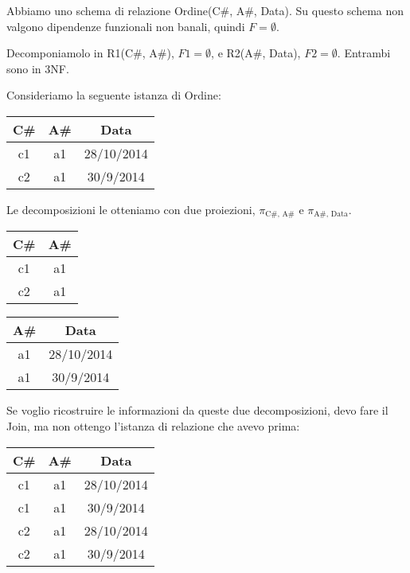 Abbiamo uno schema di relazione Ordine(C\#, A\#, Data). Su questo schema non valgono dipendenze funzionali non banali, quindi $F = \emptyset$.

Decomponiamolo in R1(C\#, A\#), $F1 = \emptyset$, e R2(A\#, Data), $F2 = \emptyset$. Entrambi sono in 3NF.

Consideriamo la seguente istanza di Ordine:

\begin{center}
\begin{tabular}{|*{3}{c|}}
\hline
C\# & A\# & Data \\
\hline
c1 & a1 & 28/10/2014 \\
\hline
c2 & a1 & 30/9/2014 \\
\hline
\end{tabular}
\end{center}

Le decomposizioni le otteniamo con due proiezioni, $\pi_{\text{C\#, A\#}}$ e $\pi_{\text{A\#, Data}}$.

\begin{center}
\begin{tabular}{|*{2}{c|}}
\hline
C\# & A\# \\
\hline
c1 & a1 \\
\hline
c2 & a1 \\
\hline
\end{tabular}
\qquad
\begin{tabular}{|*{2}{c|}}
\hline
A\# & Data \\
\hline
a1 & 28/10/2014 \\
\hline
a1 & 30/9/2014 \\
\hline
\end{tabular}
\end{center}

Se voglio ricostruire le informazioni da queste due decomposizioni, devo fare il Join, ma non ottengo l'istanza di relazione che avevo prima:

\begin{center}
\begin{tabular}{|*{3}{c|}}
\hline
C\# & A\# & Data \\
\hline
c1 & a1 & 28/10/2014 \\
\hline
c1 & a1 & 30/9/2014 \\
\hline
c2 & a1 & 28/10/2014 \\
\hline
c2 & a1 & 30/9/2014 \\
\hline
\end{tabular}
\end{center}

